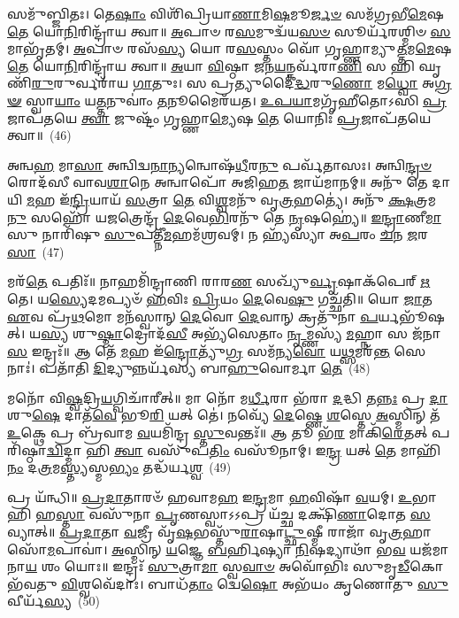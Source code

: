 𑌸𑌮𑍁᳴𑌬𑍍𑌜𑌿𑌤𑌃। 𑌤𑍇\-\ul{𑌷𑌾𑌂} 𑌵𑌿𑌶𑌿᳴𑌪𑍍𑌰𑌿𑌯𑌾\-\ul{𑌣𑌾}\-𑌮𑌿\-\ul{𑌷}\-𑌮𑍂\-\ul{𑌰𑍍𑌜}\-\-\ul{𑍞} 𑌸𑌮᳴𑌗𑍍𑌰𑌭𑍀\-\ul{𑌮𑍇}\-𑌷 \ul{𑌤𑍇} 𑌯𑍋\-\ul{𑌨𑌿}\-𑌰𑌿𑌨𑍍𑌦𑍍𑌰𑌾᳴𑌯 𑌤𑍍𑌵𑌾॥ \ul{𑌅}\-𑌪𑌾𑍞 𑌰\-\ul{𑌸}\-𑌮𑍁𑌦𑍍𑌵᳴𑌯\-\ul{𑌸}\-\-\ul{𑍞} 𑌸𑍂𑌰𑍍𑌯᳴𑌰𑌶𑍍𑌮𑌿𑍞 \ul{𑌸}\-𑌮𑌾𑌭𑍃᳴𑌤𑌮𑍍। \ul{𑌅}\-𑌪𑌾𑍞 𑌰𑌸᳴\-\ul{𑌸𑍍𑌯} 𑌯𑍋 𑌰\-\ul{𑌸}\-𑌸𑍍𑌤𑌂 𑌵𑍋᳴ 𑌗𑍃𑌹𑍍𑌣𑌾𑌮𑍍𑌯𑍁\-\ul{𑌤𑍍𑌤}\-𑌮\-\ul{𑌮𑍇}\-𑌷 \ul{𑌤𑍇} 𑌯𑍋\-\ul{𑌨𑌿}\-𑌰𑌿𑌨𑍍𑌦𑍍𑌰𑌾᳴𑌯 𑌤𑍍𑌵𑌾॥ \ul{𑌅}\-𑌯𑌾 \ul{𑌵𑌿}\-𑌷𑍍𑌠𑌾 \ul{𑌜}\-𑌨\-\ul{𑌯}\-𑌨𑍍𑌕𑌰𑍍𑌵᳴𑌰𑌾\-\ul{𑌣𑌿} 𑌸 𑌹𑌿 𑌘𑍃𑌣𑌿᳴\-\ul{𑌰𑍁}\-𑌰𑍁𑌰𑍍𑌵𑌰𑌾᳴𑌯 \ul{𑌗𑌾}\-𑌤𑍁𑌃। 𑌸 𑌪𑍍𑌰𑌤𑍍𑌯𑍁𑌦𑍈॑\-\ul{𑌦𑍍𑌧}\-𑌰𑍁\-\ul{𑌣𑍋} 𑌮\-\ul{𑌧𑍍𑌵𑍋} 𑌅\-\ul{𑌗𑍍𑌰}\-\-\ul{𑍟} 𑌸𑍍𑌵𑌾\-\ul{𑌯𑌾𑌂} 𑌯\-\ul{𑌤𑍍𑌤}\-𑌨𑍁𑌵𑌾𑌂॑ \ul{𑌤}\-𑌨𑍂𑌮𑍈𑌰᳴𑌯𑌤। \ul{𑌉}\-\-\ul{𑌪}\-\-\ul{𑌯𑌾}\-𑌮𑌗𑍃᳴𑌹𑍀𑌤𑍋\-𑌽𑌸𑌿 \ul{𑌪𑍍𑌰}\-𑌜𑌾𑌪᳴𑌤𑌯𑍇 \ul{𑌤𑍍𑌵𑌾} 𑌜𑍁𑌷𑍍𑌟𑌂᳴ 𑌗𑍃𑌹𑍍𑌣𑌾\-\ul{𑌮𑍍𑌯𑍇}\-𑌷 \ul{𑌤𑍇} 𑌯𑍋𑌨𑌿𑌃᳴ \ul{𑌪𑍍𑌰}\-𑌜𑌾𑌪᳴𑌤𑌯𑍇 𑌤𑍍𑌵𑌾॥~(46)

{\anuvakamend[{𑌕𑍋𑌶᳴\-\ul{𑌸𑍍𑌤}\-𑌨𑍁\-\ul{𑌵𑌾𑌂} 𑌤𑍍𑌰𑌯𑍋᳴𑌦𑌶 𑌚}]}%

𑌅𑌨𑍍𑌵\-\ul{𑌹} 𑌮𑌾\-\ul{𑌸𑌾} 𑌅𑌨𑍍𑌵𑌿𑌦𑍍𑌵\-\ul{𑌨𑌾}\-𑌨𑍍𑌯𑌨𑍍𑌵𑍋𑌷᳴\-\ul{𑌧𑍀}\-𑌰\-\ul{𑌨𑍁} 𑌪𑌰𑍍𑌵᳴𑌤𑌾𑌸𑌃। 𑌅𑌨𑍍𑌵𑌿\-\ul{𑌨𑍍𑌦𑍍𑌰}\-\-\ul{𑍞} 𑌰𑍋𑌦᳴𑌸𑍀 𑌵𑌾𑌵\-\ul{𑌶𑌾}\-𑌨𑍇 𑌅𑌨𑍍𑌵𑌾𑌪𑍋᳴ 𑌅𑌜𑌿𑌹\-\ul{𑌤} 𑌜𑌾𑌯᳴𑌮𑌾𑌨𑌮𑍍॥ 𑌅𑌨𑍁᳴ 𑌤𑍇 𑌦𑌾𑌯𑌿 \ul{𑌮}\-𑌹 𑌇᳴\-\ul{𑌨𑍍𑌦𑍍𑌰𑌿}\-𑌯𑌾𑌯᳴ \ul{𑌸}\-𑌤𑍍𑌰𑌾 \ul{𑌤𑍇} 𑌵𑌿\-\ul{𑌶𑍍𑌵}\-𑌮𑌨𑍁᳴ 𑌵𑍃\-\ul{𑌤𑍍𑌰}\-𑌹𑌤𑍍𑌯𑍇॑। 𑌅𑌨𑍁᳴ \ul{𑌕𑍍𑌷}\-𑌤𑍍𑌰𑌮\-\ul{𑌨𑍁} 𑌸𑌹𑍋᳴ 𑌯\-\ul{𑌜}\-𑌤𑍍𑌰𑍇𑌨𑍍𑌦𑍍𑌰᳴ \ul{𑌦𑍇}\-𑌵𑍇\-\ul{𑌭𑌿}\-𑌰𑌨𑍁᳴ 𑌤𑍇 \ul{𑌨𑍃}\-𑌷𑌹𑍍𑌯𑍇॑॥ \ul{𑌇}\-\-\ul{𑌨𑍍𑌦𑍍𑌰𑌾}\-𑌣𑍀\-\ul{𑌮𑌾}\-𑌸𑍁 𑌨𑌾𑌰𑌿᳴𑌷𑍁 \ul{𑌸𑍁}\-𑌪𑌤𑍍𑌨𑍀᳴\-\ul{𑌮}\-𑌹𑌮᳴𑌶𑍍𑌰𑌵𑌮𑍍। 𑌨 𑌹𑍍𑌯᳴𑌸𑍍𑌯𑌾 𑌅\-\ul{𑌪}\-𑌰𑌂 \ul{𑌚}\-𑌨 \ul{𑌜}\-𑌰\-\ul{𑌸𑌾}\-~(47)

𑌮𑌰᳴\-\ul{𑌤𑍇} 𑌪𑌤𑌿𑌃᳴॥ 𑌨𑌾𑌹𑌮𑌿᳴𑌨𑍍𑌦𑍍𑌰𑌾𑌣𑌿 𑌰𑌾𑌰\-\ul{𑌣} 𑌸𑌖𑍍𑌯𑍁᳴\-\ul{𑌰𑍍𑌵𑍃}\-𑌷𑌾𑌕᳴𑌪𑍇𑌰𑍍 \ul{𑌋}\-𑌤𑍇। 𑌯\-\ul{𑌸𑍍𑌯𑍇}\-𑌦𑌮𑌪𑍍𑌯𑍞᳴ \ul{𑌹}\-𑌵𑌿𑌃 \ul{𑌪𑍍𑌰𑌿}\-𑌯𑌂 \ul{𑌦𑍇}\-𑌵𑍇\-\ul{𑌷𑍁} 𑌗𑌚𑍍𑌛᳴𑌤𑌿॥ 𑌯𑍋 \ul{𑌜𑌾}\-𑌤 \ul{𑌏}\-𑌵 𑌪𑍍𑌰᳴\-\ul{𑌥}\-𑌮𑍋 𑌮𑌨᳴𑌸𑍍𑌵𑌾𑌨𑍍 \ul{𑌦𑍇}\-𑌵𑍋 \ul{𑌦𑍇}\-𑌵𑌾𑌨𑍍 𑌕𑍍𑌰𑌤𑍁᳴𑌨𑌾 \ul{𑌪}\-𑌰𑍍𑌯𑌭𑍂᳴𑌷𑌤𑍍। 𑌯\-\ul{𑌸𑍍𑌯} 𑌶𑍁\-\ul{𑌷𑍍𑌮𑌾}\-𑌦𑍍𑌰𑍋𑌦᳴\-\ul{𑌸𑍀} 𑌅𑌭𑍍𑌯᳴𑌸𑍇𑌤𑌾𑌂 \ul{𑌨𑍃}\-𑌮𑍍𑌣𑌸𑍍𑌯᳴ \ul{𑌮}\-𑌹𑍍𑌨𑌾 𑌸 𑌜᳴𑌨𑌾\-\ul{𑌸} 𑌇𑌨𑍍𑌦𑍍𑌰𑌃᳴॥ 𑌆 𑌤𑍇᳴ \ul{𑌮}\-𑌹 𑌇᳴\-\ul{𑌨𑍍𑌦𑍍𑌰𑍋}\-𑌤𑍍𑌯𑍁᳴\-\ul{𑌗𑍍𑌰} 𑌸𑌮᳴𑌨𑍍𑌯\-\ul{𑌵𑍋} 𑌯\-\ul{𑌥𑍍𑌸}\-𑌮𑌰᳴\-\ul{𑌨𑍍𑌤} 𑌸𑍇𑌨𑌾𑌃॑। 𑌪𑌤𑌾᳴𑌤𑌿 \ul{𑌦𑌿}\-𑌦𑍍𑌯𑍁𑌨𑍍𑌨𑌰𑍍𑌯᳴𑌸𑍍𑌯 𑌬𑌾\-\ul{𑌹𑍁}\-𑌵𑍋𑌰𑍍𑌮𑌾 \ul{𑌤𑍇}\-~(48)

𑌮𑌨𑍋᳴ 𑌵𑌿\-\ul{𑌷𑍍𑌵}\-𑌦𑍍𑌰𑌿\-\ul{𑌯}\-𑌗𑍍𑌵𑌿𑌚𑌾᳴𑌰𑍀𑌤𑍍॥ 𑌮𑌾 𑌨𑍋᳴ 𑌮\-\ul{𑌰𑍍𑌧𑍀}\-𑌰𑌾 𑌭᳴𑌰𑌾 \ul{𑌦}\-𑌦𑍍𑌧𑌿 𑌤\-\ul{𑌨𑍍𑌨𑌃} 𑌪𑍍𑌰 \ul{𑌦𑌾}\-𑌶𑍁\-\ul{𑌷𑍇} 𑌦𑌾𑌤᳴\-\ul{𑌵𑍇} 𑌭𑍂\-\ul{𑌰𑌿} 𑌯𑌤𑍍 𑌤𑍇॑। 𑌨𑌵𑍍𑌯𑍇᳴ \ul{𑌦𑍇}\-𑌷𑍍𑌣𑍇 \ul{𑌶}\-𑌸𑍍𑌤𑍇 \ul{𑌅}\-𑌸𑍍𑌮𑌿𑌨𑍍 𑌤᳴ \ul{𑌉}\-𑌕𑍍𑌥𑍇 𑌪𑍍𑌰 𑌬𑍍𑌰᳴𑌵𑌾𑌮 \ul{𑌵}\-𑌯𑌮𑌿᳴𑌨𑍍𑌦𑍍𑌰 \ul{𑌸𑍍𑌤𑍁}\-𑌵𑌨𑍍𑌤𑌃᳴॥ 𑌆 𑌤𑍂 𑌭᳴\-\ul{𑌰} 𑌮𑌾𑌕𑌿᳴\-\ul{𑌰𑍇}\-𑌤𑌤𑍍 𑌪𑌰𑌿᳴𑌷𑍍𑌠𑌾\-\ul{𑌦𑍍𑌵𑌿}\-𑌦𑍍𑌮𑌾 𑌹𑌿 \ul{𑌤𑍍𑌵𑌾} 𑌵𑌸𑍁᳴𑌪\-\ul{𑌤𑌿𑌂} 𑌵𑌸𑍂᳴𑌨𑌾𑌮𑍍। 𑌇\-\ul{𑌨𑍍𑌦𑍍𑌰} 𑌯𑌤𑍍 \ul{𑌤𑍇} 𑌮𑌾𑌹𑌿᳴\-\ul{𑌨𑌂} 𑌦\-\ul{𑌤𑍍𑌰}\-𑌮\-\ul{𑌸𑍍𑌤𑍍𑌯}\-𑌸𑍍𑌮\-\ul{𑌭𑍍𑌯𑌂} 𑌤𑌦𑍍𑌧᳴𑌰𑍍𑌯\-\ul{𑌶𑍍𑌵}\-~(49)

𑌪𑍍𑌰 𑌯᳴𑌨𑍍𑌧𑌿॥ \ul{𑌪𑍍𑌰}\-\-\ul{𑌦𑌾}\-𑌤𑌾𑌰𑍞᳴ 𑌹𑌵𑌾𑌮\-\ul{𑌹} 𑌇\-\ul{𑌨𑍍𑌦𑍍𑌰}\-𑌮𑌾 \ul{𑌹}\-𑌵𑌿𑌷𑌾᳴ \ul{𑌵}\-𑌯𑌮𑍍। \ul{𑌉}\-𑌭𑌾 𑌹𑌿 𑌹\-\ul{𑌸𑍍𑌤𑌾} 𑌵𑌸𑍁᳴𑌨𑌾 \ul{𑌪𑍃}\-𑌣𑌸𑍍𑌵𑌾\-𑌽\-𑌽𑌪𑍍𑌰 𑌯᳴\-\ul{𑌚𑍍𑌛} 𑌦𑌕𑍍𑌷𑌿᳴\-\ul{𑌣𑌾}\-𑌦𑍋𑌤 \ul{𑌸}\-𑌵𑍍𑌯𑌾𑌤𑍍॥ \ul{𑌪𑍍𑌰}\-\-\ul{𑌦𑌾}\-𑌤𑌾 \ul{𑌵}\-𑌜𑍍𑌰𑍀 𑌵𑍃᳴\-\ul{𑌷}\-𑌭𑌸𑍍𑌤𑍁᳴\-\ul{𑌰𑌾}\-𑌷𑌾\-\ul{𑌟𑍍𑌛𑍁}\-𑌷𑍍𑌮𑍀 𑌰𑌾𑌜𑌾᳴ 𑌵𑍃\-\ul{𑌤𑍍𑌰}\-𑌹𑌾 𑌸𑍋᳴\-\ul{𑌮}\-𑌪𑌾𑌵𑌾॑। \ul{𑌅}\-𑌸𑍍𑌮𑌿𑌨𑍍 \ul{𑌯}\-𑌜𑍍𑌞𑍇 \ul{𑌬}\-𑌰𑍍\mbox{}𑌹𑌿𑌷𑍍𑌯𑌾 \ul{𑌨𑌿}\-𑌷𑌦𑍍𑌯𑌾𑌥𑌾᳴ 𑌭\-\ul{𑌵} 𑌯𑌜᳴𑌮𑌾𑌨𑌾\-\ul{𑌯} 𑌶𑌂 𑌯𑍋𑌃॥ 𑌇𑌨𑍍𑌦𑍍𑌰𑌃᳴ \ul{𑌸𑍁}\-𑌤𑍍𑌰𑌾\-\ul{𑌮𑌾} 𑌸𑍍𑌵\-\ul{𑌵𑌾}\-\-\ul{𑍞} 𑌅𑌵𑍋᳴𑌭𑌿𑌃 𑌸𑍁𑌮𑍃\-\ul{𑌡𑍀}\-𑌕𑍋 𑌭᳴𑌵𑌤𑍁 \ul{𑌵𑌿}\-𑌶𑍍𑌵𑌵𑍇᳴𑌦𑌾𑌃। 𑌬𑌾𑌧᳴\-\ul{𑌤𑌾𑌂} 𑌦𑍍𑌵𑍇\-\ul{𑌷𑍋} 𑌅𑌭᳴𑌯𑌂 𑌕𑍃𑌣𑍋𑌤𑍁 \ul{𑌸𑍁}\-𑌵𑍀𑌰𑍍𑌯᳴\-\ul{𑌸𑍍𑌯}\-~(50)

